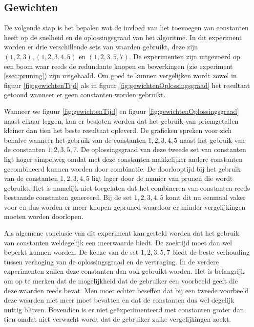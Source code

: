 \documentclass[Main.tex]{subfiles}
\begin{document}
\subsection{Gewichten}
De volgende stap is het bepalen wat de invloed van het toevoegen van constanten heeft op de snelheid en de oplossingsgraad van het algoritme. In dit experiment worden er drie verschillende sets van waarden gebruikt, deze zijn $(1,2,3), (1,2,3,4,5)$ en $(1,2,3,5,7)$. De experimenten zijn uitgevoerd op een boom waar reeds de redundante knopen en bewerkingen (zie experiment \ref{ssec:pruning}) zijn uitgehaald. Om goed te kunnen vergelijken wordt zowel in figuur \ref{fig:gewichtenTijd} als in figuur \ref{fig:gewichtenOplossingsgraad} het resultaat getoond wanneer er geen constanten worden gebruikt. 
\par Wanneer we figuur \ref{fig:gewichtenTijd} en figuur \ref{fig:gewichtenOplossingsgraad} naast elkaar leggen, kan er besloten worden dat het gebruik van priemgetallen kleiner dan tien het beste resultaat opleverd. De grafieken spreken voor zich behalve wanneer het gebruik van de constanten $1, 2, 3, 4, 5$  naast het gebruik van de constanten $1, 2, 3, 5, 7$. De oplossingsgraad van deze tweede set van constanten ligt hoger simpelweg omdat met deze constanten makkelijker andere constanten gecombineerd kunnen worden door combinatie. De doorlooptijd bij het gebruik van de constanten $1, 2, 3, 4, 5$ ligt lager door de manier van prunen die wordt gebruikt. Het is namelijk niet toegelaten dat het combineren van constanten reeds bestaande constanten genereerd. Bij de set $1, 2, 3, 4, 5$ komt dit nu eenmaal vaker voor en dus worden er meer knopen gepruned waardoor er minder vergelijkingen moeten worden doorlopen.\par
Als algemene conclusie van dit experiment kan gesteld worden dat het gebruik van constanten weldegelijk een meerwaarde biedt. De zoektijd moet dan wel beperkt kunnen worden. De keuze van de set $1, 2, 3, 5, 7$ biedt de beste verhouding tussen verhoging van de oplossingsgraad en de vertraging. In de verdere experimenten zullen deze constanten dan ook gebruikt worden. Het is belangrijk om op te merken dat de mogelijkheid dat de gebruiker een voorbeeld geeft die deze waarden reeds bevat. Men moet echter beseffen dat bij een tweede voorbeeld deze waarden niet meer moet bevatten en dat de constanten dus wel degelijk nuttig blijven. Bovendien is er niet ge\"experimenteerd met constanten groter dan tien omdat niet verwacht wordt dat de gebruiker zulke vergelijkingen zoekt.
\end{document}
